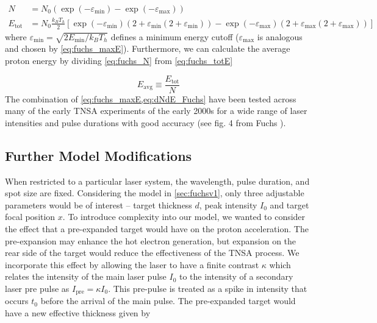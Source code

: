 \begin{align}
	N &= N_0 (\exp(-\varepsilon_\text{min}) - \exp(-\varepsilon_\text{max})) \label{eq:fuchs_N} \\
	E_\text{tot} &= N_0 \frac{k_B T_h}{2}[\exp(-\varepsilon_\text{min})(2 + \varepsilon_\text{min}(2 + \varepsilon_\text{min})) - \exp(-\varepsilon_\text{max})(2 + \varepsilon_\text{max}(2 + \varepsilon_\text{max}))] \label{eq:fuchs_totE}
\end{align}
where $\varepsilon_\text{min} = \sqrt{2 E_\text{min} / k_B T_h}$ defines a minimum energy cutoff ($\varepsilon_\text{max}$ is analogous and chosen by \cref{eq:fuchs_maxE}). Furthermore, we can calculate the average proton energy by dividing \cref{eq:fuchs_N} from \cref{eq:fuchs_totE}

\begin{equation}
	E_\text{avg} \equiv \frac{E_\text{tot}}{N} \label{eq:fuchs_avgE}
\end{equation}
The combination of \cref{eq:fuchs_maxE,eq:dNdE_Fuchs} have been tested across many of the early \gls{TNSA} experiments of the early 2000s for a wide range of laser intensities and pulse durations with good accuracy (see fig. 4 from Fuchs \cite{Fuchs_2005_Nat}).

\subsection{Further Model Modifications} \label{sec:fuchsv2}
When restricted to a particular laser system, the wavelength, pulse duration, and spot size are fixed. Considering the model in \cref{sec:fuchsv1}, only three adjustable parameters would be of interest -- target thickness $d$, peak intensity $I_0$ and target focal position $x$. To introduce complexity into our model, we wanted to consider the effect that a pre-expanded target would have on the proton acceleration. The pre-expansion may enhance the hot electron generation, but expansion on the rear side of the target would reduce the effectiveness of the \gls{TNSA} process. We incorporate this effect by allowing the laser to have a finite contrast $\kappa$ which relates the intensity of the main laser pulse $I_0$ to the intensity of a secondary laser pre pulse as $I_\text{pre} = \kappa I_0$. This pre-pulse is treated as a spike in intensity that occurs $t_0$ before the arrival of the main pulse. The pre-expanded target would have a new effective thickness given by 

